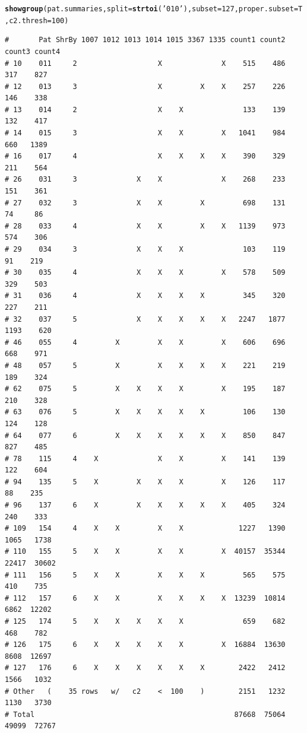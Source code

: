 \documentclass{article}\usepackage[]{graphicx}\usepackage[]{color}
\makeatletter
\newcommand{\hlnum}[1]{\textcolor[rgb]{0.686,0.059,0.569}{#1}}%
\newcommand{\hlstr}[1]{\textcolor[rgb]{0.192,0.494,0.8}{#1}}%
\newcommand{\hlstd}[1]{\textcolor[rgb]{0.345,0.345,0.345}{#1}}%
\newcommand{\hlkwc}[1]{\textcolor[rgb]{0.333,0.667,0.333}{#1}}%
\newcommand{\hlkwd}[1]{\textcolor[rgb]{0.737,0.353,0.396}{\textbf{#1}}}%
\newenvironment{kframe}{%
 \def\at@end@of@kframe{}%
 \ifinner\ifhmode%
  \def\at@end@of@kframe{\end{minipage}}%
  \begin{minipage}{\columnwidth}%
 \fi\fi%
 \def\FrameCommand##1{\hskip\@totalleftmargin \hskip-\fboxsep
 \colorbox{shadecolor}{##1}\hskip-\fboxsep
     \hskip-\linewidth \hskip-\@totalleftmargin \hskip\columnwidth}%
 \MakeFramed {\advance\hsize-\width
   \@totalleftmargin\z@ \linewidth\hsize
   \@setminipage}}%
 {\par\unskip\endMakeFramed%
 \at@end@of@kframe}
\newenvironment{knitrout}{}{} %
\makeatother
\begin{document}
\begin{knitrout}
\begin{kframe}
\begin{alltt}
\hlkwd{showgroup}\hlstd{(pat.summaries,}\hlkwc{split}\hlstd{=}\hlkwd{strtoi}\hlstd{(}\hlstr{'010'}\hlstd{),} \hlkwc{subset}\hlstd{=}\hlnum{127}\hlstd{,} \hlkwc{proper.subset}\hlstd{=T,} \hlkwc{c2.thresh}\hlstd{=}\hlnum{100}\hlstd{)}
\end{alltt}
\begin{verbatim}
#       Pat ShrBy 1007 1012 1013 1014 1015 3367 1335 count1 count2 count3 count4
# 10    011     2                   X              X    515    486    317    827
# 12    013     3                   X         X    X    257    226    146    338
# 13    014     2                   X    X              133    139    132    417
# 14    015     3                   X    X         X   1041    984    660   1389
# 16    017     4                   X    X    X    X    390    329    211    564
# 26    031     3              X    X              X    268    233    151    361
# 27    032     3              X    X         X         698    131     74     86
# 28    033     4              X    X         X    X   1139    973    574    306
# 29    034     3              X    X    X              103    119     91    219
# 30    035     4              X    X    X         X    578    509    329    503
# 31    036     4              X    X    X    X         345    320    227    211
# 32    037     5              X    X    X    X    X   2247   1877   1193    620
# 46    055     4         X         X    X         X    606    696    668    971
# 48    057     5         X         X    X    X    X    221    219    189    324
# 62    075     5         X    X    X    X         X    195    187    210    328
# 63    076     5         X    X    X    X    X         106    130    124    128
# 64    077     6         X    X    X    X    X    X    850    847    827    485
# 78    115     4    X              X    X         X    141    139    122    604
# 94    135     5    X         X    X    X         X    126    117     88    235
# 96    137     6    X         X    X    X    X    X    405    324    240    333
# 109   154     4    X    X         X    X             1227   1390   1065   1738
# 110   155     5    X    X         X    X         X  40157  35344  22417  30602
# 111   156     5    X    X         X    X    X         565    575    410    735
# 112   157     6    X    X         X    X    X    X  13239  10814   6862  12202
# 125   174     5    X    X    X    X    X              659    682    468    782
# 126   175     6    X    X    X    X    X         X  16884  13630   8608  12697
# 127   176     6    X    X    X    X    X    X        2422   2412   1566   1032
# Other   (    35 rows   w/   c2    <  100    )        2151   1232   1130   3730
# Total                                               87668  75064  49099  72767
\end{verbatim}
\end{kframe}
\end{knitrout}
\end{document}
